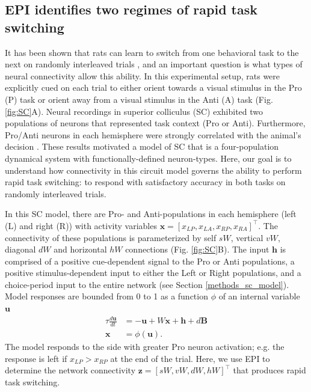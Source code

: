 \documentclass[11pt]{article}
\begin{document}
\subsection{EPI identifies two regimes of rapid task switching} \label{results_SC}
It has been shown that rats can learn to switch from one behavioral task to the next on randomly interleaved trials \cite{duan2015requirement}, and an important question is what types of neural connectivity allow this ability.
In this experimental setup, rats were explicitly cued on each trial to either orient towards a visual stimulus in the Pro (P) task or orient away from a visual stimulus in the Anti (A) task (Fig. \ref{fig:SC}A). 
Neural recordings in superior colliculus (SC) exhibited two populations of neurons that represented task context (Pro or Anti).
Furthermore, Pro/Anti neurons in each hemisphere were strongly correlated with the animal's decision \cite{duan2018collicular}.
These results motivated a model of SC that is a four-population dynamical system with functionally-defined neuron-types.
Here, our goal is to understand how connectivity in this circuit model governs the ability to perform rapid task switching: to respond with satisfactory accuracy in both tasks on randomly interleaved trials.

In this SC model, there are Pro- and Anti-populations in each hemisphere (left (L) and right (R)) with activity variables $\mathbf{x} = [x_{LP}, x_{LA}, x_{RP}, x_{RA}]^\top$.
The connectivity of these populations is parameterized by self $sW$, vertical $vW$, diagonal $dW$ and horizontal $hW$ connections (Fig. \ref{fig:SC}B).
The input $\mathbf{h}$ is comprised of a positive cue-dependent signal to the Pro or Anti populations, a positive stimulus-dependent input to either the Left or Right populations, and a choice-period input to the entire network (see Section \ref{methods_sc_model}).
Model responses are bounded from 0 to 1 as a function $\phi$ of an internal variable $\mathbf{u}$
\begin{equation}
\begin{split}
\tau \frac{d\mathbf{u}}{dt} &= -\mathbf{u} + W\mathbf{x} + \mathbf{h} + d\mathbf{B} \\
\mathbf{x} &= \phi(\mathbf{u}).
\end{split}
\end{equation}
The model responds to the side with greater Pro neuron activation; e.g. the response is left if $x_{LP} > x_{RP}$ at the end of the trial.  
Here, we use EPI to determine the network connectivity $\mathbf{z} = [sW, vW, dW, hW]^{\top}$ that produces rapid task switching.
\end{document}
